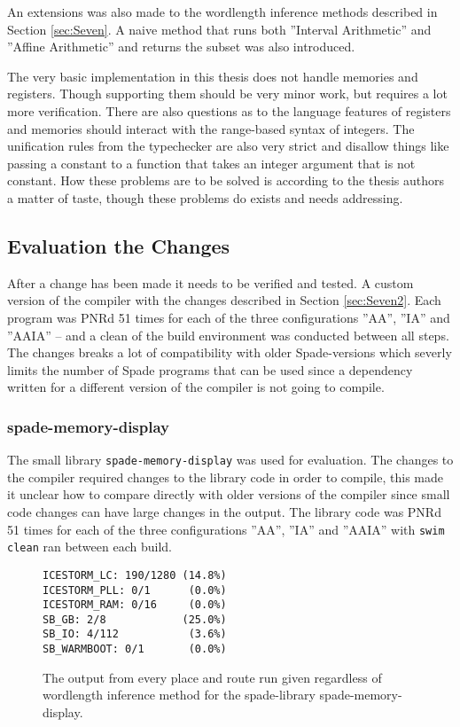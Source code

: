 \documentclass[msc,lith,english]{liuthesis}
\begin{document}
An extensions was also made to the wordlength inference methods described in Section \ref{sec:Seven}. A naive method that runs both ''Interval Arithmetic'' and ''Affine Arithmetic'' and returns the subset was also introduced.

The very basic implementation in this thesis does not handle memories and registers. Though supporting them should be very minor work, but requires a lot more verification. There are also questions as to the language features of registers and memories should interact with the range-based syntax of integers. The unification rules from the typechecker are also very strict and disallow things like passing a constant to a function that takes an integer argument that is not constant. How these problems are to be solved is according to the thesis authors a matter of taste, though these problems do exists and needs addressing. 

\subsection{Evaluation the Changes}
After a change has been made it needs to be verified and tested. A custom version of the compiler with the changes described in Section \ref{sec:Seven2}. Each program was PNRd 51 times for each of the three configurations ''AA'', ''IA'' and ''AAIA'' -- and a clean of the build environment was conducted between all steps. The changes breaks a lot of compatibility with older Spade-versions which severly limits the number of Spade programs that can be used since a dependency written for a different version of the compiler is not going to compile.

\subsubsection{spade-memory-display}
The small library \verb+spade-memory-display+ was used for evaluation. The changes to the compiler required changes to the library code in order to compile, this made it unclear how to compare directly with older versions of the compiler since small code changes can have large changes in the output. The library code was PNRd 51 times for each of the three configurations ''AA'', ''IA'' and ''AAIA'' with \verb+swim clean+ ran between each build.
 
\begin{figure}
\begin{center}
\begin{verbatim}
ICESTORM_LC: 190/1280 (14.8%)
ICESTORM_PLL: 0/1      (0.0%)
ICESTORM_RAM: 0/16     (0.0%)
SB_GB: 2/8            (25.0%)
SB_IO: 4/112           (3.6%)
SB_WARMBOOT: 0/1       (0.0%)
\end{verbatim}
\end{center}

  \caption{The output from every place and route run given regardless of wordlength inference method for the spade-library spade-memory-display.}
  \label{fig:SMDoutput}
\end{figure}
\end{document}
